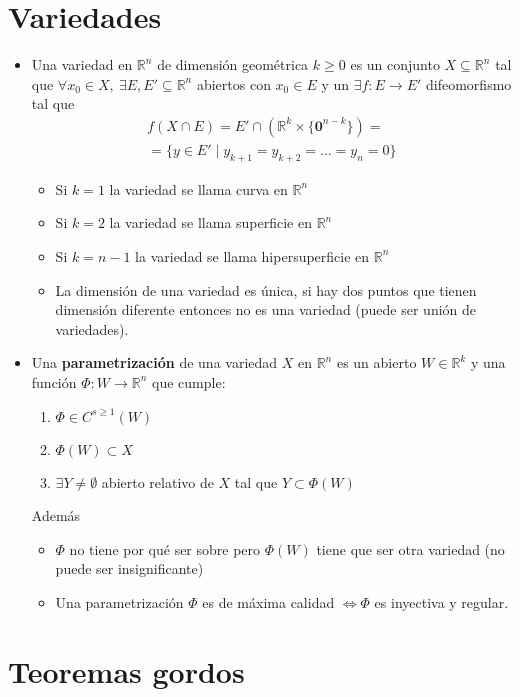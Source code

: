 \documentclass[a4paper,twocolumn]{extarticle}
\newcommand{\R}{\mathbb{R}}
\begin{document}
\section{Variedades}
\begin{itemize}
	\item Una variedad en $\R^n$ de dimensión geométrica $k \geq 0$ es un conjunto $X \subseteq \R^n$ tal que $\forall x_0 \in X,\ \exists E, E' \subseteq \R^n$ abiertos con $x_0 \in E$ y un $\exists f:E \to E'$ difeomorfismo tal que
	\begin{multline*}
		f(X \cap E) = E' \cap (\R^k \times \{\mathbf{0}^{n-k}\}) =\\= \{y \in E' \mid y_{k+1} = y_{k+2} = \dots = y_{n} = 0\}
	\end{multline*}
	\begin{itemize}
		\item Si $k = 1$ la variedad se llama curva en $\R^n$
		\item Si $k = 2$ la variedad se llama superficie en $\R^n$
		\item Si $k = n-1$ la variedad se llama hipersuperficie en $\R^n$
		\item La dimensión de una variedad es única, si hay dos puntos que tienen dimensión diferente entonces no es una variedad (puede ser unión de variedades).
	\end{itemize}
	\item Una \textbf{parametrización} de una variedad $X$ en $\R^n$ es un abierto $W \in \R^k$ y una función $\Phi:W \to \R^n$ que cumple:
	\begin{enumerate}
		\item $\Phi \in C^{s \geq 1}(W)$
		\item $\Phi(W) \subset X$
		\item $\exists Y \neq \emptyset$ abierto relativo de $X$ tal que $Y \subset \Phi(W)$ 
	\end{enumerate}
	Además
	\begin{itemize}
		\item $\Phi$ no tiene por qué ser sobre pero $\Phi(W)$ tiene que ser otra variedad (no puede ser insignificante)
		\item Una parametrización $\Phi$ es de máxima calidad $\iff \Phi$ es inyectiva y regular.
	\end{itemize}
\end{itemize}

\section{Teoremas gordos}
\end{document}
